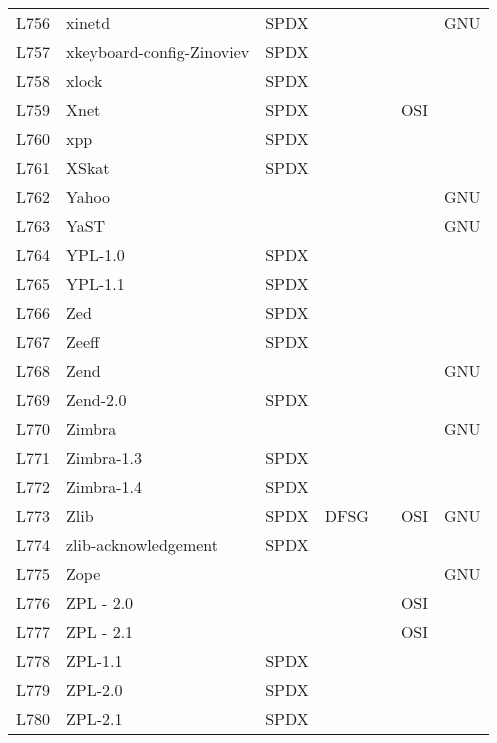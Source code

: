 \begin{longtable}[h]{m{2cm} | m{7cm} | c | c | c | c | c}
  L756 & xinetd & SPDX &  &  &  & GNU \\
  L757 & xkeyboard-config-Zinoviev & SPDX &  &  &  &  \\
  L758 & xlock & SPDX &  &  &  &  \\
  L759 & Xnet & SPDX &  &  & OSI &  \\
  L760 & xpp & SPDX &  &  &  &  \\
  L761 & XSkat & SPDX &  &  &  &  \\
  L762 & Yahoo &  &  &  &  & GNU \\
  L763 & YaST &  &  &  &  & GNU \\
  L764 & YPL-1.0 & SPDX &  &  &  &  \\
  L765 & YPL-1.1 & SPDX &  &  &  &  \\
  L766 & Zed & SPDX &  &  &  &  \\
  L767 & Zeeff & SPDX &  &  &  &  \\
  L768 & Zend &  &  &  &  & GNU \\
  L769 & Zend-2.0 & SPDX &  &  &  &  \\
  L770 & Zimbra &  &  &  &  & GNU \\
  L771 & Zimbra-1.3 & SPDX &  &  &  &  \\
  L772 & Zimbra-1.4 & SPDX &  &  &  &  \\
  L773 & Zlib & SPDX & DFSG &  & OSI & GNU \\
  L774 & zlib-acknowledgement & SPDX &  &  &  &  \\
  L775 & Zope &  &  &  &  & GNU \\
  L776 & ZPL - 2.0 &  &  &  & OSI &  \\
  L777 & ZPL - 2.1 &  &  &  & OSI &  \\
  L778 & ZPL-1.1 & SPDX &  &  &  &  \\
  L779 & ZPL-2.0 & SPDX &  &  &  &  \\
  L780 & ZPL-2.1 & SPDX &  &  &  & 
\end{longtable}